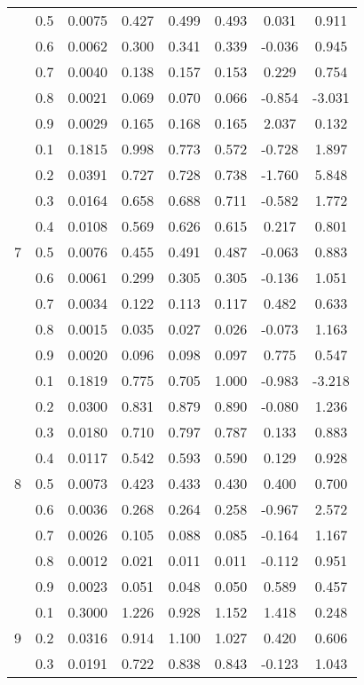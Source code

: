 \documentclass[11pt,a4paper]{report}
\begin{document}
\begin{longtable}{ | c | c || c | c | c | c | c | c | }
 & 0.5 & 0.0075 & 0.427 & 0.499 & 0.493 & 0.031 & 0.911 \\
 & 0.6 & 0.0062 & 0.300 & 0.341 & 0.339 & -0.036 & 0.945 \\
 & 0.7 & 0.0040 & 0.138 & 0.157 & 0.153 & 0.229 & 0.754 \\
 & 0.8 & 0.0021 & 0.069 & 0.070 & 0.066 & -0.854 & -3.031 \\
 & 0.9 & 0.0029 & 0.165 & 0.168 & 0.165 & 2.037 & 0.132 \\
 \hline
\multirow{9}{*}{7} & 0.1 & 0.1815 & 0.998 & 0.773 & 0.572 & -0.728 & 1.897 \\
 & 0.2 & 0.0391 & 0.727 & 0.728 & 0.738 & -1.760 & 5.848 \\
 & 0.3 & 0.0164 & 0.658 & 0.688 & 0.711 & -0.582 & 1.772 \\
 & 0.4 & 0.0108 & 0.569 & 0.626 & 0.615 & 0.217 & 0.801 \\
 & 0.5 & 0.0076 & 0.455 & 0.491 & 0.487 & -0.063 & 0.883 \\
 & 0.6 & 0.0061 & 0.299 & 0.305 & 0.305 & -0.136 & 1.051 \\
 & 0.7 & 0.0034 & 0.122 & 0.113 & 0.117 & 0.482 & 0.633 \\
 & 0.8 & 0.0015 & 0.035 & 0.027 & 0.026 & -0.073 & 1.163 \\
 & 0.9 & 0.0020 & 0.096 & 0.098 & 0.097 & 0.775 & 0.547 \\
 \hline
\multirow{9}{*}{8} & 0.1 & 0.1819 & 0.775 & 0.705 & 1.000 & -0.983 & -3.218 \\
 & 0.2 & 0.0300 & 0.831 & 0.879 & 0.890 & -0.080 & 1.236 \\
 & 0.3 & 0.0180 & 0.710 & 0.797 & 0.787 & 0.133 & 0.883 \\
 & 0.4 & 0.0117 & 0.542 & 0.593 & 0.590 & 0.129 & 0.928 \\
 & 0.5 & 0.0073 & 0.423 & 0.433 & 0.430 & 0.400 & 0.700 \\
 & 0.6 & 0.0036 & 0.268 & 0.264 & 0.258 & -0.967 & 2.572 \\
 & 0.7 & 0.0026 & 0.105 & 0.088 & 0.085 & -0.164 & 1.167 \\
 & 0.8 & 0.0012 & 0.021 & 0.011 & 0.011 & -0.112 & 0.951 \\
 & 0.9 & 0.0023 & 0.051 & 0.048 & 0.050 & 0.589 & 0.457 \\
 \hline
\multirow{9}{*}{9} & 0.1 & 0.3000 & 1.226 & 0.928 & 1.152 & 1.418 & 0.248 \\
 & 0.2 & 0.0316 & 0.914 & 1.100 & 1.027 & 0.420 & 0.606 \\
 & 0.3 & 0.0191 & 0.722 & 0.838 & 0.843 & -0.123 & 1.043 \\

\end{longtable}
\end{document}
